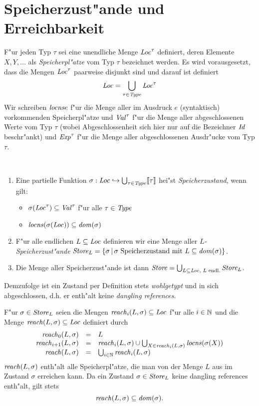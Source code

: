 \documentclass[12pt,a4paper,bigheadings]{scrartcl}
\newcommand{\semantic}[1]{\ensuremath{\llbracket#1\rrbracket}}
\newcommand{\locns}{\name{locns}}
\newcommand{\reach}{\name{reach}}
\begin{document}
\section{Speicherzust"ande und Erreichbarkeit}

F"ur jeden Typ $\tau$ sei eine unendliche Menge ${\text{\it Loc\/}}^\tau$ definiert, deren Elemente $X,Y,\ldots$
als {\em Speicherpl"atze} vom Typ $\tau$ bezeichnet werden. Es wird vorausgesetzt, dass die Mengen
${\text{\it Loc\/}}^\tau$ paarweise disjunkt sind und darauf ist definiert
\[
  {\text{\it Loc\/}} = \bigcup_{\tau\in{\text{\it Type\/}}} {\text{\it Loc\/}}^\tau
\]
Wir schreiben $\locns{e}$ f"ur die Menge aller im Ausdruck $e$ (syntaktisch) vorkommenden Speicherpl"atze
und ${\text{\it Val\/}}^\tau$ f"ur die Menge aller abgeschlossenen Werte vom Typ $\tau$ (wobei Abgeschlossenheit sich
hier nur auf die Bezeichner ${\text{\it Id\/}}$ beschr"ankt) und ${\text{\it Exp\/}}^\tau$ f"ur die Menge aller abgeschlossenen
Ausdr"ucke vom Typ $\tau$.

\begin{definition}[Speicherzustand] \
  \begin{enumerate}
    \item Eine partielle Funktion $\sigma: \Loc \pto \bigcup_{\tau\in\Type} \semantic{\tau}$ hei"st
          {\em Speicherzustand}, wenn gilt:
          \begin{itemize}
            \item $\sigma({\text{\it Loc\/}}^\tau) \subseteq {\text{\it Val\/}}^\tau$ f"ur alle $\tau\in{\text{\it Type\/}}$
            \item $\locns(\sigma(\Loc)) \subseteq \dom{\sigma}$
          \end{itemize}

    \item F"ur alle endlichen $L \subseteq {\text{\it Loc\/}}$ definieren wir eine Menge aller {\em $L$-Speicherzust"ande}
          ${\text{\it Store\/}}_L = \{\sigma\,|\,\text{$\sigma$ Speicherzustand mit $L\subseteq{\text{\it dom\/}}(\sigma)$}\}$.

    \item Die Menge aller Speicherzust"ande ist dann ${\text{\it Store\/}} = \bigcup_{L\subseteq{\text{\it Loc\/}},\text{ $L$ endl.}} {\text{\it Store\/}}_L$.
  \end{enumerate}
\end{definition}
Demzufolge ist ein Zustand per Definition stets {\em wohlgetypt} und in sich abgeschlossen,
d.h. er enth"alt keine {\em dangling references}.

F"ur $\sigma\in{\text{\it Store\/}}_L$ seien die Mengen $\reach_i(L,\sigma)\subseteq \Loc$ f"ur alle
$i\in{\mathord{\mathbb N}}$ und die Menge $\reach(L,\sigma)\subseteq\Loc$ definiert durch
\[\begin{array}{rcl}
  \reach_0(L,\sigma) & = & L \\
  \reach_{i+1}(L,\sigma) & = & \reach_i(L,\sigma)
             \cup \bigcup_{X\in\reach_i(L,\sigma)} \locns(\sigma(X)) \\
  \reach(L,\sigma) & = & \bigcup_{i\in\setN} \reach_i(L,\sigma)
\end{array}\]
$\reach(L,\sigma)$ enth"alt alle Speicherpl"atze, die man von der Menge $L$ aus im
Zustand $\sigma$ erreichen kann. Da ein Zustand $\sigma\in{\text{\it Store\/}}_L$ keine dangling references
enth"alt, gilt stets
\[
  \reach(L,\sigma) \subseteq \dom{\sigma}.
\]
\end{document}
